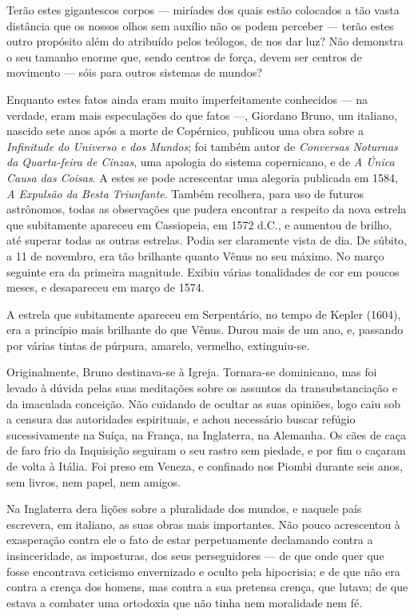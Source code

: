 \documentclass[11pt,a5paper,twoside,openany]{book}
\begin{document}
Terão estes gigantescos corpos — miríades dos quais estão colocados a tão vasta distância que os nossos olhos sem auxílio não os podem perceber — terão estes outro propósito além do atribuído pelos teólogos, de nos dar luz? Não demonstra o seu tamanho enorme que, sendo centros de força, devem ser centros de movimento — sóis para outros sistemas de mundos?

Enquanto estes fatos ainda eram muito imperfeitamente conhecidos — na verdade, eram mais especulações do que fatos —, Giordano Bruno, um italiano, nascido sete anos após a morte de Copérnico, publicou uma obra sobre a \textit{Infinitude do Universo e dos Mundos}; foi também autor de \textit{Conversas Noturnas da Quarta-feira de Cinzas}, uma apologia do sistema copernicano, e de \textit{A Única Causa das Coisas}. A estes se pode acrescentar uma alegoria publicada em 1584, \textit{A Expulsão da Besta Triunfante}. Também recolhera, para uso de futuros astrônomos, todas as observações que pudera encontrar a respeito da nova estrela que subitamente apareceu em Cassiopeia, em 1572 d.C., e aumentou de brilho, até superar todas as outras estrelas. Podia ser claramente vista de dia. De súbito, a 11 de novembro, era tão brilhante quanto Vênus no seu máximo. No março seguinte era da primeira magnitude. Exibiu várias tonalidades de cor em poucos meses, e desapareceu em março de 1574.

A estrela que subitamente apareceu em Serpentário, no tempo de Kepler (1604), era a princípio mais brilhante do que Vênus. Durou mais de um ano, e, passando por várias tintas de púrpura, amarelo, vermelho, extinguiu-se.

Originalmente, Bruno destinava-se à Igreja. Tornara-se dominicano, mas foi levado à dúvida pelas suas meditações sobre os assuntos da transubstanciação e da imaculada conceição. Não cuidando de ocultar as suas opiniões, logo caiu sob a censura das autoridades espirituais, e achou necessário buscar refúgio sucessivamente na Suíça, na França, na Inglaterra, na Alemanha. Os cães de caça de faro frio da Inquisição seguiram o seu rastro sem piedade, e por fim o caçaram de volta à Itália. Foi preso em Veneza, e confinado nos Piombi durante seis anos, sem livros, nem papel, nem amigos.

Na Inglaterra dera lições sobre a pluralidade dos mundos, e naquele país escrevera, em italiano, as suas obras mais importantes. Não pouco acrescentou à exasperação contra ele o fato de estar perpetuamente declamando contra a insinceridade, as imposturas, dos seus perseguidores — de que onde quer que fosse encontrava ceticismo envernizado e oculto pela hipocrisia; e de que não era contra a crença dos homens, mas contra a sua pretensa crença, que lutava; de que estava a combater uma ortodoxia que não tinha nem moralidade nem fé.
\end{document}
